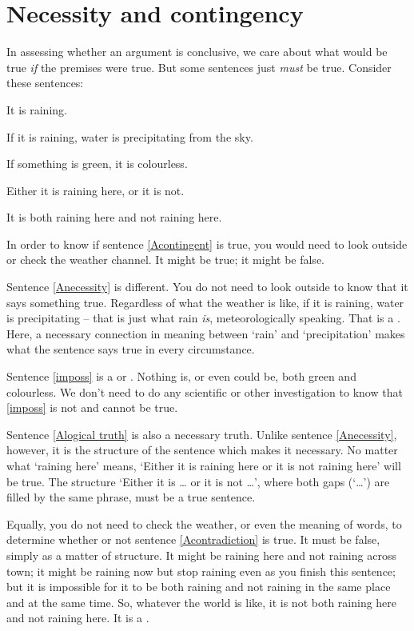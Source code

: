 \section{Necessity and contingency}\label{s:neccandcont}
In assessing whether an argument is conclusive, we care about what would be true \emph{if} the premises were true. But some sentences just \emph{must} be true. Consider these sentences:
	\begin{earg}
		\item[\ex{Acontingent}] It is raining.
		\item[\ex{Anecessity}] If it is raining, water is precipitating from the sky.
		\item[\ex{imposs}] If something is green, it is colourless.
		\item[\ex{Alogical truth}] Either it is raining here, or it is not.
		\item[\ex{Acontradiction}] It is both raining here and not raining here.
	\end{earg}
In order to know if sentence \ref{Acontingent} is true, you would need to look outside or check the weather channel. It might be true; it might be false.

Sentence \ref{Anecessity} is different. You do not need to look outside to know that it says something true. Regardless of what the weather is like, if it is raining, water is precipitating – that is just what rain \emph{is}, meteorologically speaking. That is a . Here, a necessary connection in meaning between `rain' and `precipitation' makes what the sentence says true in every circumstance.

Sentence \ref{imposs} is a  or . Nothing is, or even could be, both green and colourless. We don't need to do any scientific or other investigation to know that \ref{imposs} is not and cannot be true.

Sentence \ref{Alogical truth} is also a necessary truth. Unlike sentence \ref{Anecessity}, however, it is the structure of the sentence which makes it necessary. No matter what `raining here' means, `Either it is raining here or it is not raining here' will be true. The structure `\textsf{Either it is} … \textsf{or it is not} …', where both gaps (`…') are filled by the same phrase, must be a true sentence.

Equally, you do not need to check the weather, or even the meaning of words, to determine whether or not sentence \ref{Acontradiction} is true. It must be false, simply as a matter of structure. It might be raining here and not raining across town; it might be raining now but stop raining even as you finish this sentence; but it is impossible for it to be both raining and not raining in the same place and at the same time. So, whatever the world is like, it is not both raining here and not raining here. It is a .

